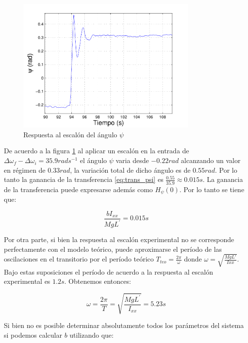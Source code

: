 \documentclass[main]{subfiles}
\begin{document}
\begin{figure}
  \centering
 \includegraphics[width=0.8\textwidth]{./pics_verificacion/esc_psi}
  \caption{Respuesta al escal\'on del \'angulo $\psi$}
  \label{fig:esc_psi}
\end{figure}

De acuerdo a la figura \ref{fig:esc_psi} al aplicar un escal\'on en la entrada de $\Delta \omega_f - \Delta \omega_i = 35.9 rad s^{-1}$ el \'angulo $\psi$ varia desde $-0.22 rad$ alcanzando un valor en r\'egimen de $0.33 rad$, la variaci\'on total de dicho \'angulo es de $0.55 rad$. Por lo tanto la ganancia de la transferencia \ref{eq:trans_psi} es $\frac{0.55}{35.9}  \approx 0.015 s$. La ganancia de la transferencia puede expresarse adem\'as como $H_{\psi}(0)$. Por lo tanto se tiene que:

\begin{equation}
\frac{bI_{xx}}{MgL^\prime} = 0.015 s
\end{equation}

Por otra parte, si bien la respuesta al escal\'on experimental no se corresponde perfectamente con el modelo te\'orico, puede aproximarse el per\'iodo de las oscilaciones en el transitorio por el per\'iodo te\'orico $T_{teo} = \frac{2\pi}{\omega}$ donde $\omega = \sqrt{\frac{MgL\prime}{Ixx}}$. Bajo estas suposiciones el per\'iodo de acuerdo a la respuesta al escal\'on experimental es $1.2s$. Obtenemos entonces:

\begin{equation}
\omega = \frac{2\pi}{T} = \sqrt{\frac{MgL^\prime}{I_{xx}}}=5.23 s
\end{equation}

Si bien no es posible determinar absolutamente todos los par\'ametros del sistema si podemos calcular $b$ utilizando que:
\end{document}
